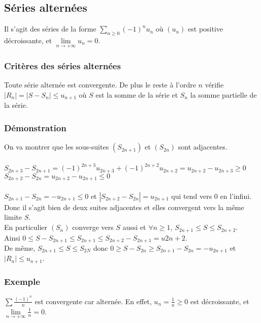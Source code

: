 \documentclass[a4paper,10pt]{book} %
\newcommand{\abs}[1]{\left|#1\right|}
\begin{document}
\subsection{Séries alternées}
Il s'agit des séries de la forme $\sum_{n\geq 0}(-1)^n u_n$ où $(u_n)$ est positive décroissante, et $\lim\limits_{n\rightarrow +\infty}u_n=0$.

\subsubsection{Critères des séries alternées}
Toute série alternée est convergente. De plus le reste à l'ordre $n$ vérifie $\abs{R_n}=\abs{S-S_n}\leq u_{n+1}$
où $S$ est la somme de la série et $S_n$ la somme partielle de la série.

\subsubsection{Démonstration}
On va montrer que les sous-suites $(S_{2n+1})$ et $(S_{2n})$ sont adjacentes.\\\\
$S_{2n+3}-S_{2n+1}=(-1)^{2n+3}u_{2n+3}+(-1)^{2n+2}u_{2n+2}=u_{2n+2}-u_{2n+3}\geq 0$\\
$S_{2n+2}-S_{2n}=u_{2n+2}-u_{2n+1}\leq 0$\\\\
$S_{2n+1}-S_{2n}=-u_{2n+1}\leq 0$ et $\abs{S_{2n+2}-S_{2n}}=u_{2n+1}$ qui tend vers 0 en l'infini.\\

Donc il s'agit bien de deux suites adjacentes et elles convergent vers la même limite $S$.\\
En particulier $(S_n)$ converge vers $S$ aussi et $\forall n\geq 1$, $S_{2n+1}\leq S\leq S_{2n+2}$.\\

Ainsi $0\leq S-S_{2n+1}\leq S_{2n+1}\leq S_{2n+2}-S_{2n+1}=u{2n+2}$.\\
De même, $S_{2n+1}\leq S\leq S_{2N}$ donc $0\geq S-S_{2n}\geq S_{2n+1}-S_{2n}=-u_{2n+1}$ et $\abs{R_n}\leq u_{n+1}$.

\subsubsection{Exemple}
$\sum \frac{(-1)^n}{n}$ est convergente car alternée. En effet, $u_n=\frac{1}{n}\geq 0$ est décroissante, et $\lim\limits_{n\rightarrow+\infty}\frac{1}{n}=0$.

\newpage
\end{document}
